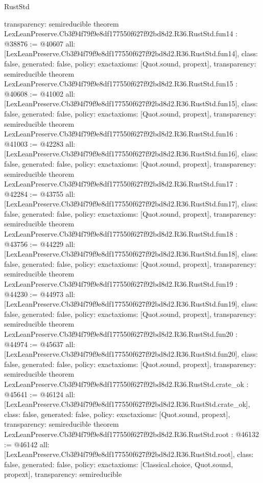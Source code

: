 \begin{lexlean}{RustStd}
\begin{coremodule}
{  transparency: semireducible
}
theorem LexLeanPreserve.Cb3f94f79f9e8df177550f627f92bd8d2.R36.RustStd.fun14 : @38876 := @40607 {
  all: [LexLeanPreserve.Cb3f94f79f9e8df177550f627f92bd8d2.R36.RustStd.fun14],
  class: false,
  generated: false,
  policy: exact{axioms: [Quot.sound, propext]},
  transparency: semireducible
}
theorem LexLeanPreserve.Cb3f94f79f9e8df177550f627f92bd8d2.R36.RustStd.fun15 : @40608 := @41002 {
  all: [LexLeanPreserve.Cb3f94f79f9e8df177550f627f92bd8d2.R36.RustStd.fun15],
  class: false,
  generated: false,
  policy: exact{axioms: [Quot.sound, propext]},
  transparency: semireducible
}
theorem LexLeanPreserve.Cb3f94f79f9e8df177550f627f92bd8d2.R36.RustStd.fun16 : @41003 := @42283 {
  all: [LexLeanPreserve.Cb3f94f79f9e8df177550f627f92bd8d2.R36.RustStd.fun16],
  class: false,
  generated: false,
  policy: exact{axioms: [Quot.sound, propext]},
  transparency: semireducible
}
theorem LexLeanPreserve.Cb3f94f79f9e8df177550f627f92bd8d2.R36.RustStd.fun17 : @42284 := @43755 {
  all: [LexLeanPreserve.Cb3f94f79f9e8df177550f627f92bd8d2.R36.RustStd.fun17],
  class: false,
  generated: false,
  policy: exact{axioms: [Quot.sound, propext]},
  transparency: semireducible
}
theorem LexLeanPreserve.Cb3f94f79f9e8df177550f627f92bd8d2.R36.RustStd.fun18 : @43756 := @44229 {
  all: [LexLeanPreserve.Cb3f94f79f9e8df177550f627f92bd8d2.R36.RustStd.fun18],
  class: false,
  generated: false,
  policy: exact{axioms: [Quot.sound, propext]},
  transparency: semireducible
}
theorem LexLeanPreserve.Cb3f94f79f9e8df177550f627f92bd8d2.R36.RustStd.fun19 : @44230 := @44973 {
  all: [LexLeanPreserve.Cb3f94f79f9e8df177550f627f92bd8d2.R36.RustStd.fun19],
  class: false,
  generated: false,
  policy: exact{axioms: [Quot.sound, propext]},
  transparency: semireducible
}
theorem LexLeanPreserve.Cb3f94f79f9e8df177550f627f92bd8d2.R36.RustStd.fun20 : @44974 := @45637 {
  all: [LexLeanPreserve.Cb3f94f79f9e8df177550f627f92bd8d2.R36.RustStd.fun20],
  class: false,
  generated: false,
  policy: exact{axioms: [Quot.sound, propext]},
  transparency: semireducible
}
theorem LexLeanPreserve.Cb3f94f79f9e8df177550f627f92bd8d2.R36.RustStd.crate_ok : @45641 := @46124 {
  all: [LexLeanPreserve.Cb3f94f79f9e8df177550f627f92bd8d2.R36.RustStd.crate_ok],
  class: false,
  generated: false,
  policy: exact{axioms: [Quot.sound, propext]},
  transparency: semireducible
}
theorem LexLeanPreserve.Cb3f94f79f9e8df177550f627f92bd8d2.R36.RustStd.root : @46132 := @46142 {
  all: [LexLeanPreserve.Cb3f94f79f9e8df177550f627f92bd8d2.R36.RustStd.root],
  class: false,
  generated: false,
  policy: exact{axioms: [Classical.choice, Quot.sound, propext]},
  transparency: semireducible
}


\end{coremodule}
\end{lexlean}
